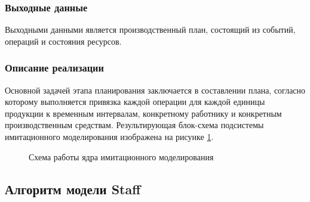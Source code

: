 \subsubsection*{Выходные данные}
Выходными данными является производственный план, состоящий из событий, операций и состояния ресурсов.

\subsubsection*{Описание реализации}
Основной задачей этапа планирования заключается в составлении плана, согласно которому выполняется привязка каждой операции для каждой единицы продукции к временным интервалам, конкретному работнику и конкретным производственным средствам. 
Результирующая блок-схема подсистемы имитационного моделирования изображена на рисунке \ref{ris:IM_blockShema}.

\begin{figure}[H]
    \caption{Схема работы ядра имитационного моделирования}
    \label{ris:IM_blockShema}
\end{figure}


\subsection{Алгоритм модели Staff}

